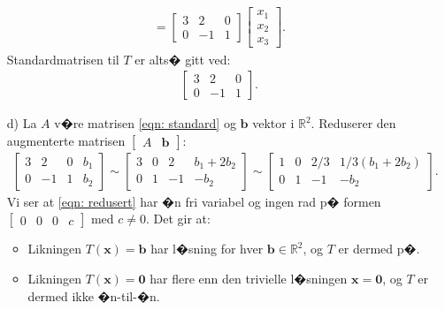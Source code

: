 \documentclass[a4paper, norsk, 12pt]{extarticle}
\begin{document}
\begin{itemize}
\begin{align*}
= \begin{bmatrix} 3 & 2 & 0 \\ 0 & -1 & 1 \end{bmatrix} \begin{bmatrix} x_1 \\ x_2 \\ x_3 \end{bmatrix}.
\end{align*}
Standardmatrisen til $T$ er alts� gitt ved:
\begin{align} \label{eqn: standard}
\begin{bmatrix} 3 & 2 & 0 \\ 0 & -1 & 1 \end{bmatrix}.
\end{align}

\item[d)]
La $A$ v�re matrisen \eqref{eqn: standard} og $\boldsymbol{b}$ vektor i $\mathbb{R}^2$. Reduserer den augmenterte matrisen $\begin{bmatrix} A & \boldsymbol{b} \end{bmatrix}$:
\begin{align} \label{eqn: redusert}
	\begin{bmatrix} 3 & 2 & 0 & b_1\\ 0 & -1 & 1 & b_2 \end{bmatrix}
\sim \begin{bmatrix} 3 & 0 & 2 & b_1 + 2b_2 \\ 0 & 1 & -1 & - b_2 \end{bmatrix}
\sim \begin{bmatrix} 1 & 0 & 2/3 & 1/3(b_1 + 2b_2) \\ 0 & 1 & -1 & - b_2 \end{bmatrix}.
\end{align}
Vi ser at \eqref{eqn: redusert} har �n fri variabel og ingen rad p� formen $\begin{bmatrix} 0 & 0 & 0 & c\end{bmatrix}$ med $c \neq 0$. Det gir at:
\begin{itemize}
\item Likningen $T(\boldsymbol{x}) = \boldsymbol{b}$ har l�sning for hver $\boldsymbol{b} \in \mathbb{R}^2$, og $T$ er dermed p�.
\item Likningen $T(\boldsymbol{x}) = \boldsymbol{0}$ har flere enn den trivielle l�sningen $\boldsymbol{x} = \boldsymbol{0}$, og $T$ er dermed ikke �n-til-�n.
\end{itemize}

\end{itemize}
\end{document}
